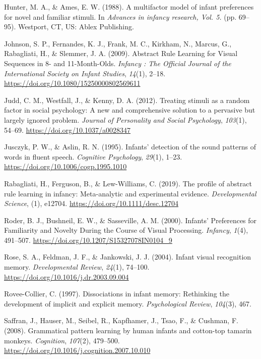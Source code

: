 \documentclass[
  english,
  man,man,floatsintext]{apa6}
\begin{document}
\leavevmode\hypertarget{ref-hunter1988}{}%
Hunter, M. A., \& Ames, E. W. (1988). A multifactor model of infant preferences for novel and familiar stimuli. In \emph{Advances in infancy research, Vol. 5.} (pp. 69--95). Westport, CT, US: Ablex Publishing.

\leavevmode\hypertarget{ref-johnson2009}{}%
Johnson, S. P., Fernandes, K. J., Frank, M. C., Kirkham, N., Marcus, G., Rabagliati, H., \& Slemmer, J. A. (2009). Abstract Rule Learning for Visual Sequences in 8- and 11-Month-Olds. \emph{Infancy : The Official Journal of the International Society on Infant Studies}, \emph{14}(1), 2--18. \url{https://doi.org/10.1080/15250000802569611}

\leavevmode\hypertarget{ref-judd2012}{}%
Judd, C. M., Westfall, J., \& Kenny, D. A. (2012). Treating stimuli as a random factor in social psychology: A new and comprehensive solution to a pervasive but largely ignored problem. \emph{Journal of Personality and Social Psychology}, \emph{103}(1), 54--69. \url{https://doi.org/10.1037/a0028347}

\leavevmode\hypertarget{ref-jusczyk1995}{}%
Jusczyk, P. W., \& Aslin, R. N. (1995). Infants' detection of the sound patterns of words in fluent speech. \emph{Cognitive Psychology}, \emph{29}(1), 1--23. \url{https://doi.org/10.1006/cogp.1995.1010}

\leavevmode\hypertarget{ref-rabagliati2019}{}%
Rabagliati, H., Ferguson, B., \& Lew-Williams, C. (2019). The profile of abstract rule learning in infancy: Meta-analytic and experimental evidence. \emph{Developmental Science}, (1), e12704. \url{https://doi.org/10.1111/desc.12704}

\leavevmode\hypertarget{ref-roder2000}{}%
Roder, B. J., Bushneil, E. W., \& Sasseville, A. M. (2000). Infants' Preferences for Familiarity and Novelty During the Course of Visual Processing. \emph{Infancy}, \emph{1}(4), 491--507. \url{https://doi.org/10.1207/S15327078IN0104_9}

\leavevmode\hypertarget{ref-rose2004}{}%
Rose, S. A., Feldman, J. F., \& Jankowski, J. J. (2004). Infant visual recognition memory. \emph{Developmental Review}, \emph{24}(1), 74--100. \url{https://doi.org/10.1016/j.dr.2003.09.004}

\leavevmode\hypertarget{ref-rovee-collier1997}{}%
Rovee-Collier, C. (1997). Dissociations in infant memory: Rethinking the development of implicit and explicit memory. \emph{Psychological Review}, \emph{104}(3), 467.

\leavevmode\hypertarget{ref-saffran2008}{}%
Saffran, J., Hauser, M., Seibel, R., Kapfhamer, J., Tsao, F., \& Cushman, F. (2008). Grammatical pattern learning by human infants and cotton-top tamarin monkeys. \emph{Cognition}, \emph{107}(2), 479--500. \url{https://doi.org/10.1016/j.cognition.2007.10.010}
\end{document}
